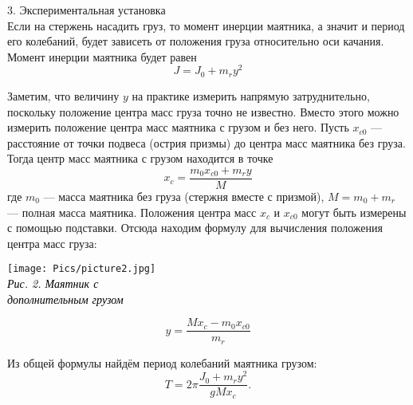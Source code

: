 \documentclass[12pt, a4paper]{article}
\begin{document}
        {\Large 3. Экспериментальная установка \\}
        Если на стержень насадить груз, то момент инерции маятника, а значит
        и период его колебаний, будет зависеть от положения груза относительно
        оси качания. Момент инерции маятника будет равен
        \begin{displaymath}
            J = J_0 + m_ry^2
        \end{displaymath}
        \noindent\begin{minipage}[c]{0.67\textwidth}
            \hspace{1cm}
            Заметим, что величину $𝑦$ на практике измерить напрямую затруднительно, поскольку положение центра масс
            груза точно не известно. Вместо этого можно измерить
            положение центра масс маятника с грузом и без него.
            Пусть $𝑥_{c0}$ --- расстояние от точки подвеса (острия
            призмы) до центра масс маятника без груза. Тогда центр
            масс маятника с грузом находится в точке
            \begin{displaymath}
                x_c = \frac{m_0x_{c0} + m_ry}{M}
            \end{displaymath}
            где $𝑚_0$ — масса маятника без груза (стержня вместе с
            призмой), $𝑀 = 𝑚_0 + 𝑚_r$ — полная масса маятника. Положения центра масс $x_c$ и $𝑥_{c0}$ могут быть измерены с
            помощью подставки. Отсюда находим формулу для вычисления положения центра масс груза:
        \end{minipage}
        \begin{minipage}[c]{0.32\textwidth}
            \begin{center}
                \texttt{[image: Pics/picture2.jpg]} \\
                \textit{\textcolor[HTML]{000000}{Рис. 2. Маятник с \\ дополнительным грузом}}
            \end{center}
        \end{minipage}
        \begin{equation}
            y = \frac{Mx_c - m_0x_{c0}}{m_r}
        \end{equation}

        Из общей формулы найдём период колебаний маятника грузом:
        \begin{equation}
            T = 2\pi\frac{J_0 + m_ry^2}{gMx_c}.
        \end{equation}
\end{document}
